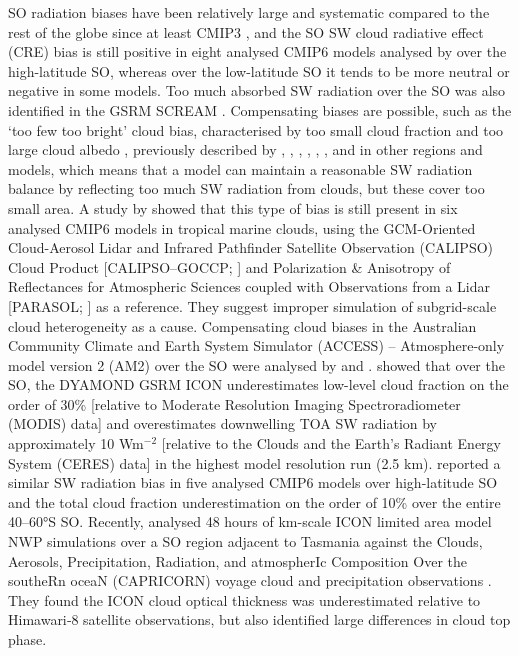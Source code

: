 \documentclass[draft]{agujournal2019}
\begin{document}
SO radiation biases have been relatively large and systematic compared to the
rest of the globe since at least CMIP3 , and the SO SW
cloud radiative effect (CRE) bias is still positive in eight analysed CMIP6
models analysed by  over the high-latitude SO, whereas
over the low-latitude SO it tends to be more neutral or negative in some
models. Too much absorbed SW radiation over the SO was also identified in the
GSRM SCREAM . Compensating biases are possible, such as the
`too few too bright' cloud bias, characterised by too small cloud fraction and
too large cloud albedo , previously described by
, , , ,
, , and  in other regions and
models, which means that a model can maintain a reasonable SW radiation balance
by reflecting too much SW radiation from clouds, but these cover too small
area.  A study by  showed that this type of bias is still
present in six analysed CMIP6 models in tropical marine clouds, using the
GCM-Oriented Cloud-Aerosol Lidar and Infrared Pathfinder Satellite Observation
(CALIPSO) Cloud Product [CALIPSO--GOCCP; ] and Polarization
\& Anisotropy of Reflectances for Atmospheric Sciences coupled with
Observations from a Lidar [PARASOL; ] as a reference. They
suggest improper simulation of subgrid-scale cloud heterogeneity as a cause.
Compensating cloud biases in the Australian Community Climate and Earth System
Simulator (ACCESS) – Atmosphere-only model version 2 (AM2) over the SO were
analysed by  and .   showed
that over the SO, the DYAMOND GSRM ICON underestimates low-level cloud fraction
on the order of 30\% [relative to Moderate Resolution Imaging Spectroradiometer
(MODIS) data] and overestimates downwelling TOA SW radiation by approximately
10 Wm$^\mathrm{-2}$ [relative to the Clouds and the Earth’s Radiant Energy
System (CERES) data] in the highest model resolution run (2.5 km).
 reported a similar SW radiation bias in five analysed CMIP6
models over high-latitude SO and the total cloud fraction underestimation on
the order of 10\% over the entire 40--60°S SO. Recently, 
analysed 48 hours of km-scale ICON limited area model NWP simulations over a SO
region adjacent to Tasmania against the Clouds, Aerosols, Precipitation,
Radiation, and atmospherIc Composition Over the southeRn oceaN (CAPRICORN)
voyage cloud and precipitation observations . They found
the ICON cloud optical thickness was underestimated relative to Himawari‐8
satellite observations, but also identified large differences in cloud top
phase.
\end{document}

